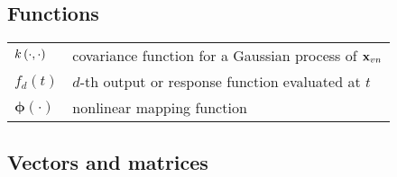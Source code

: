\subsection*{Functions}

\begin{tabular}{m{3cm}m{12cm}}
	$k\left(\cdot,\cdot\right)$ & covariance function for a Gaussian process of $\mathbf{x}_{vn}$\\
	$f_d(t)$ & $d$-th output or response function evaluated at $t$\\
	 $\bm{\phi}\left(\cdot\right)$ & nonlinear mapping function\\
\end{tabular}

\subsection*{Vectors and matrices}


